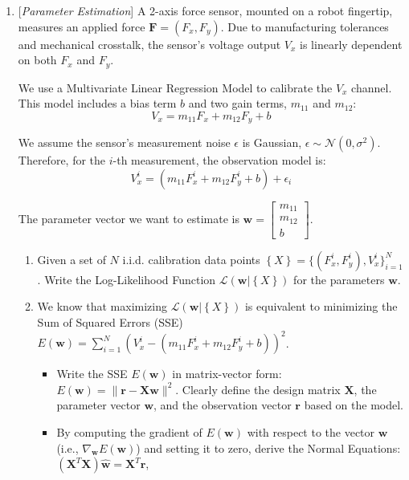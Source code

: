 \documentclass[10pt]{article}
\newcommand{\mbf}[1]{\mathbf{#1}}
\newcommand{\gauss}{\mathcal{N}}
\newcommand{\set}[1]{\left\{#1\right\}}
\newcommand{\mat}[1]{\mathbf{#1}}
\begin{document}
\begin{enumerate}
\item {} {[}\textit{Parameter Estimation}{]} A 2-axis force sensor, mounted on a robot fingertip, measures an applied force $\mbf{F} = (F_x, F_y)$. Due to manufacturing tolerances and mechanical crosstalk, the sensor's voltage output $V_x$ is linearly dependent on both $F_x$ and $F_y$.

We use a Multivariate Linear Regression Model to calibrate the $V_x$ channel. This model includes a bias term $b$ and two gain terms, $m_{11}$ and $m_{12}$:
$$V_x = m_{11} F_x + m_{12} F_y + b$$

We assume the sensor's measurement noise $\epsilon$ is Gaussian, $\epsilon \sim \gauss(0, \sigma^2)$. Therefore, for the $i$-th measurement, the observation model is:
$$V_x^i = (m_{11} F_x^i + m_{12} F_y^i + b) + \epsilon_i$$

The parameter vector we want to estimate is $\mbf{w} = \begin{bmatrix} m_{11} \\ m_{12} \\ b \end{bmatrix}$.



\begin{enumerate}
    \item Given a set of $N$ i.i.d. calibration data points $\set{X} = \{ (F_x^i, F_y^i), V_x^i \}_{i=1}^N$. Write the Log-Likelihood Function $\mathcal{L}(\mbf{w} | \set{X})$ for the parameters $\mbf{w}$. 

    \item We know that maximizing $\mathcal{L}(\mbf{w} | \set{X})$ is equivalent to minimizing the Sum of Squared Errors (SSE) $E(\mbf{w}) = \sum_{i=1}^{N} (V_x^i - (m_{11} F_x^i + m_{12} F_y^i + b))^2$.
    
    \begin{itemize}
        \item Write the SSE $E(\mbf{w})$ in matrix-vector form: $E(\mbf{w}) = \|\mbf{r} - \mat{X}\mbf{w}\|^2$. Clearly define the design matrix $\mat{X}$, the parameter vector $\mbf{w}$, and the observation vector $\mbf{r}$ based on the model.
        
        \item By computing the gradient of $E(\mbf{w})$ with respect to the vector $\mbf{w}$ (i.e., $\nabla_{\mbf{w}} E(\mbf{w})$) and setting it to zero, derive the Normal Equations:
        $(\mat{X}^T \mat{X}) \hat{\mbf{w}} = \mat{X}^T \mbf{r}$,
        

\end{itemize}
\end{enumerate}
\end{enumerate}
\end{document}
